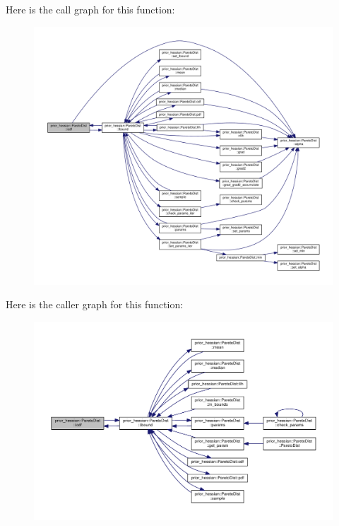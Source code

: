 Here is the call graph for this function\+:\nopagebreak
\begin{figure}[H]
\begin{center}
\leavevmode
\includegraphics[width=350pt]{classprior__hessian_1_1ParetoDist_a9d1040a7a5ca261feebe56f42e5698ea_cgraph}
\end{center}
\end{figure}




Here is the caller graph for this function\+:\nopagebreak
\begin{figure}[H]
\begin{center}
\leavevmode
\includegraphics[width=350pt]{classprior__hessian_1_1ParetoDist_a9d1040a7a5ca261feebe56f42e5698ea_icgraph}
\end{center}
\end{figure}


